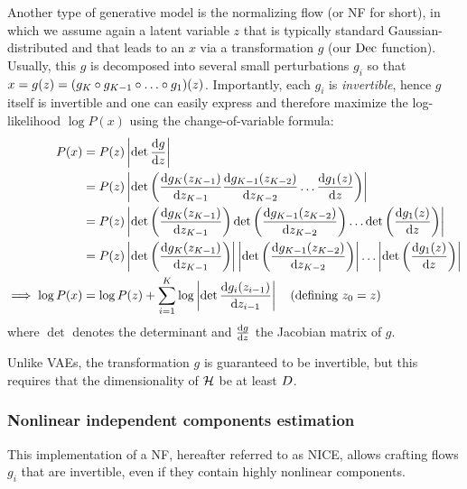 \documentclass[../main.tex]{subfiles}
\begin{document}
Another type of generative model is the normalizing flow (or NF for short), in which we assume again a latent variable $z$ that is typically standard Gaussian-distributed and that leads to an $x$ via a transformation $g$ (our $\operatorname{Dec}$ function).
Usually, this $g$ is decomposed into several small perturbations $g_i$ so that $x = g(z) = (g_K \circ g_{K-1} \circ \ldots \circ g_1) (z)$.
Importantly, each $g_i$ is \emph{invertible}, hence $g$ itself is invertible and one can easily express and therefore maximize the log-likelihood $\log P(x)$ using the change-of-variable formula:
%
\begin{align*}
    P(x)               & = P(z) \left\lvert \det \frac{\mathrm{d} g}{\mathrm{d} z} \right\rvert       \\
                       & = P(z) \left\lvert \det \left(
        \frac{\mathrm{d} g_K(z_{K-1})}{\mathrm{d} z_{K-1}}
        \frac{\mathrm{d} g_{K-1}(z_{K-2})}{\mathrm{d} z_{K-2}}
        \ldots
        \frac{\mathrm{d} g_1(z)}{\mathrm{d} z}
    \right)\right\rvert                                                   \\
                       & = P(z) \left\lvert
        \det \left(
        \frac{\mathrm{d} g_K(z_{K-1})}{\mathrm{d} z_{K-1}}
        \right)
        \det \left(
        \frac{\mathrm{d} g_{K-1}(z_{K-2})}{\mathrm{d} z_{K-2}}
        \right)
        \ldots
        \det \left(
        \frac{\mathrm{d} g_1(z)}{\mathrm{d} z}
        \right)
    \right\rvert                                                          \\
                       & = P(z) \left\lvert
        \det \left(
        \frac{\mathrm{d} g_K(z_{K-1})}{\mathrm{d} z_{K-1}}
        \right)
    \right\rvert
    \left\lvert
        \det \left(
        \frac{\mathrm{d} g_{K-1}(z_{K-2})}{\mathrm{d} z_{K-2}}
        \right)
    \right\rvert
    \ldots
    \left\lvert
        \det \left(
        \frac{\mathrm{d} g_1(z)}{\mathrm{d} z}
        \right)
    \right\rvert                                                          \\
    \implies \log P(x) & = \log P(z) + \sum_{i=1}^K \log \left\lvert
        \det \frac{\mathrm{d} g_i(z_{i-1})}{\mathrm{d} z_{i-1}}
    \right\rvert\quad \text{(defining $z_0 = z$)}
\end{align*}
where $\det$ denotes the determinant and $\frac{\mathrm{d} g}{\mathrm{d} z}$ the Jacobian matrix of $g$.

Unlike VAEs, the transformation $g$ is guaranteed to be invertible, but this requires that the dimensionality of $\mathcal{H}$ be at least $D$.

\subsubsection{Nonlinear independent components estimation}

This implementation of a NF, hereafter referred to as NICE, allows crafting flows $g_i$ that are invertible, even if they contain highly nonlinear components.
\end{document}
